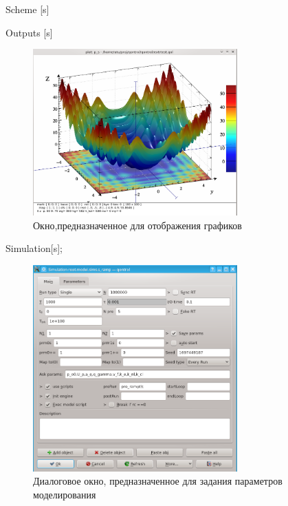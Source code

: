 Scheme [s]

Outputs [s]

\begin{figure}[htb!]
  \begin{center}
    \includegraphics[width=0.7\textwidth]{p/qontrol_3d_a.png}
  \end{center}
  \caption{Окно,предназначенное для отображения графиков}
  \label{atu:f:qontrol_3d}
\end{figure}

Simulation[s];

\begin{figure}[htb!]
  \begin{center}
    \includegraphics[width=0.7\textwidth]{p/qontrol_task.png}
  \end{center}
  \caption{Диалоговое окно, предназначенное для задания параметров моделирования}
  \label{atu:f:qontrol_simul}
\end{figure}


